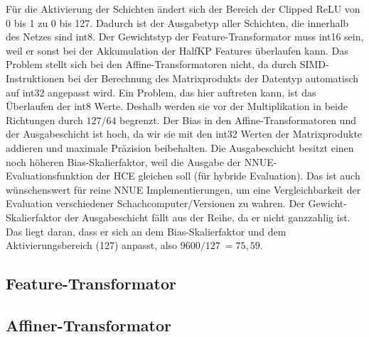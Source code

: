 \begin{table}[h]
  \caption{Skalierfaktor und Datentypen für Gewichte und Bias des \acp{NNUE} sowie Ausgabetyp der Schichten. Basierend auf Werten der Stockfish \ac{NNUE} Implementierung \cite{StockfishNNUE}}
  \label{table:netQuantization}
  \renewcommand{\arraystretch}{1.2}
  \centering
  \sffamily
  \begin{footnotesize}
  \end{footnotesize}
  \rmfamily
\end{table}

Für die Aktivierung der Schichten ändert sich der Bereich der Clipped \ac{ReLU} von 0 bis 1 zu 0 bis 127. Dadurch ist der Ausgabetyp aller Schichten, die innerhalb des Netzes sind int8. Der Gewichtstyp der Feature-Transformator muss int16 sein, weil er sonst bei der Akkumulation der HalfKP Features überlaufen kann. Das Problem stellt sich bei den Affine-Transformatoren nicht, da durch \ac{SIMD}-Instruktionen bei der Berechnung des Matrixprodukts der Datentyp automatisch auf int32 angepasst wird. Ein Problem, das hier auftreten kann, ist das Überlaufen der int8 Werte. Deshalb werden sie vor der Multiplikation in beide Richtungen durch $127/64$ begrenzt. Der Bias in den Affine-Transformatoren und der Ausgabeschicht ist hoch, da wir sie mit den int32 Werten der Matrixprodukte addieren und maximale Präzision beibehalten. Die Ausgabeschicht besitzt einen noch höheren Bias-Skalierfaktor, weil die Ausgabe der \ac{NNUE}-Evaluationsfunktion der \ac{HCE} gleichen soll (für hybride Evaluation). Das ist auch wünschenswert für reine NNUE Implementierungen, um eine Vergleichbarkeit der Evaluation verschiedener Schachcomputer/Versionen zu wahren. Der Gewicht-Skalierfaktor der Ausgabeschicht fällt aus der Reihe, da er nicht ganzzahlig ist. Das liegt daran, dass er sich an dem Bias-Skalierfaktor und dem Aktivierungsbereich (127) anpasst, also $9600/127~=75,59$.

\subsection{Feature-Transformator}


\subsection{Affiner-Transformator}
